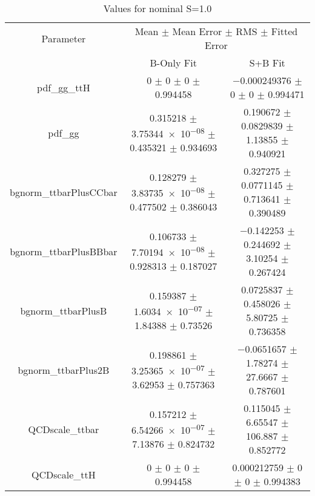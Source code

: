 \begin{table}
\centering
\caption{Values for nominal S=1.0}
\begin{tabular}{ccc}
\toprule
Parameter & \multicolumn{2}{c}{Mean $\pm$ Mean Error $\pm$ RMS $\pm$ Fitted Error}\\
 & B-Only Fit & S+B Fit\\
\midrule
pdf\_gg\_ttH & \num{0} $\pm$ \num{0} $\pm$ \num{0} $\pm$ \num{0.994458} & \num{-0.000249376} $\pm$ \num{0} $\pm$ \num{0} $\pm$ \num{0.994471}\\
pdf\_gg & \num{0.315218} $\pm$ \num{3.75344e-08} $\pm$ \num{0.435321} $\pm$ \num{0.934693} & \num{0.190672} $\pm$ \num{0.0829839} $\pm$ \num{1.13855} $\pm$ \num{0.940921}\\
bgnorm\_ttbarPlusCCbar & \num{0.128279} $\pm$ \num{3.83735e-08} $\pm$ \num{0.477502} $\pm$ \num{0.386043} & \num{0.327275} $\pm$ \num{0.0771145} $\pm$ \num{0.713641} $\pm$ \num{0.390489}\\
bgnorm\_ttbarPlusBBbar & \num{0.106733} $\pm$ \num{7.70194e-08} $\pm$ \num{0.928313} $\pm$ \num{0.187027} & \num{-0.142253} $\pm$ \num{0.244692} $\pm$ \num{3.10254} $\pm$ \num{0.267424}\\
bgnorm\_ttbarPlusB & \num{0.159387} $\pm$ \num{1.6034e-07} $\pm$ \num{1.84388} $\pm$ \num{0.73526} & \num{0.0725837} $\pm$ \num{0.458026} $\pm$ \num{5.80725} $\pm$ \num{0.736358}\\
bgnorm\_ttbarPlus2B & \num{0.198861} $\pm$ \num{3.25365e-07} $\pm$ \num{3.62953} $\pm$ \num{0.757363} & \num{-0.0651657} $\pm$ \num{1.78274} $\pm$ \num{27.6667} $\pm$ \num{0.787601}\\
QCDscale\_ttbar & \num{0.157212} $\pm$ \num{6.54266e-07} $\pm$ \num{7.13876} $\pm$ \num{0.824732} & \num{0.115045} $\pm$ \num{6.65547} $\pm$ \num{106.887} $\pm$ \num{0.852772}\\
QCDscale\_ttH & \num{0} $\pm$ \num{0} $\pm$ \num{0} $\pm$ \num{0.994458} & \num{0.000212759} $\pm$ \num{0} $\pm$ \num{0} $\pm$ \num{0.994383}\\
\bottomrule
\end{tabular}
\end{table}